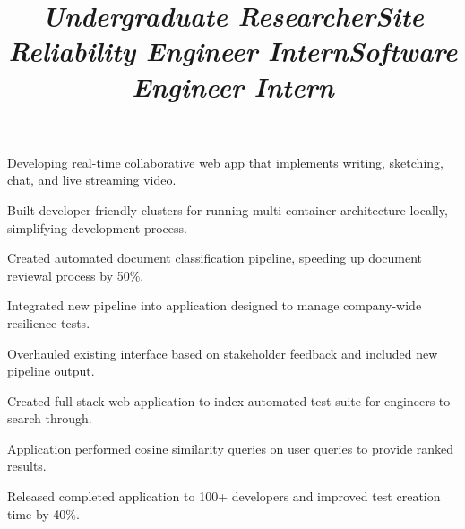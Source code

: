 \documentclass[margin,line,11pt,letterpaper]{res}
\begin{document}
\begin{resume}
    \title{\textit{Undergraduate Researcher}}
    \begin{position}
        \vspace{-3mm}
        \begin{list2}
            \item{Developing real-time collaborative web app that implements writing, sketching, chat, and live streaming video.}
            \item{Built developer-friendly clusters for running multi-container architecture locally, simplifying development process.}
        \end{list2}
    \end{position}

    \title{\textit{Site Reliability Engineer Intern}}
    \begin{position}
        \vspace{-3mm}
        \begin{list2}
            \item Created automated document classification pipeline, speeding up document reviewal process by 50\%.
            \item Integrated new pipeline into application designed to manage company-wide resilience tests.
            \item Overhauled existing interface based on stakeholder feedback and included new pipeline output.
        \end{list2}
    \end{position}

    \title{\textit{Software Engineer Intern}}
    \begin{position}
        \vspace{-3mm}
        \begin{list2}
            \item Created full-stack web application to index automated test suite for engineers to search through.
            \item Application performed cosine similarity queries on user queries to provide ranked results.
            \item Released completed application to 100+ developers and improved test creation time by 40\%.
        \end{list2}
    \end{position}



\end{resume}
\end{document}
